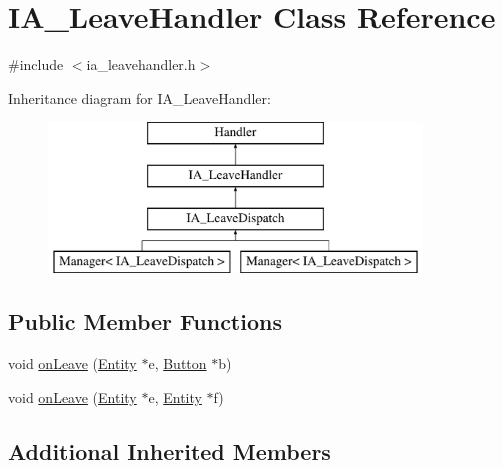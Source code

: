 \hypertarget{class_i_a___leave_handler}{\section{I\-A\-\_\-\-Leave\-Handler Class Reference}
\label{class_i_a___leave_handler}
}


{\ttfamily \#include $<$ia\-\_\-leavehandler.\-h$>$}

Inheritance diagram for I\-A\-\_\-\-Leave\-Handler\-:\begin{figure}[H]
\begin{center}
\leavevmode
\includegraphics[height=4.000000cm]{class_i_a___leave_handler}
\end{center}
\end{figure}
\subsection*{Public Member Functions}
\begin{DoxyCompactItemize}
\item 
void \hyperlink{class_i_a___leave_handler_a5f4f139c55b4a4938c15eaff18bf870c}{on\-Leave} (\hyperlink{class_entity}{Entity} $\ast$e, \hyperlink{class_button}{Button} $\ast$b)
\item 
void \hyperlink{class_i_a___leave_handler_a40f4d48eb0b7fd01a3c663cb6fbfb871}{on\-Leave} (\hyperlink{class_entity}{Entity} $\ast$e, \hyperlink{class_entity}{Entity} $\ast$f)
\end{DoxyCompactItemize}
\subsection*{Additional Inherited Members}


